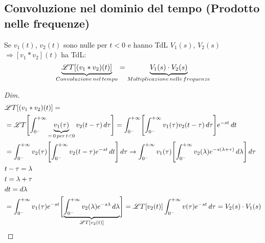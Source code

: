 \subsection{Convoluzione nel dominio del tempo (Prodotto nelle frequenze)}
Se $v_1(t)$, $v_2(t)$ sono nulle per $t < 0$ e hanno TdL $V_1(s)$, $V_2(s)$ $\Rightarrow [v_1 * v_2](t)$ ha TdL:\\
\[
   \underbrace{\mathscr{L}T[(v_1 * v_2)(t)]}_{Convoluzione\, nel\, tempo} = \underbrace{V_1(s)\cdot V_2(s)}_{Moltiplicazione\, nelle\, frequenze}
\]
\begin{proof}[Dim]
   \[
      \begin{split}
         &\mathscr{L}T[(v_1 * v_2)(t)] =\\
         & = \mathscr{L}T\Biggl[\int_{0^-}^{+\infty} \underbrace{v_1(\tau)}_{=\, 0\, per\, t < 0}v_2(t - \tau)\,d\tau\Biggr] = \int_{0^-}^{+\infty}\Biggl[\int_{0^-}^{+\infty} v_1(\tau)v_2(t - \tau)\,d\tau\Biggr]e^{-st}\,dt\\
         & = \int_{0^-}^{+\infty} v_2(\tau)\Biggl[\int_{0^-}^{+\infty} v_2(t - \tau)e^{-st}\,dt\Biggr]\,d\tau \rightarrow \int_{0^-}^{+\infty} v_1(\tau)\Biggl[\int_{0^-}^{+\infty} v_2(\lambda)e^{-s(\lambda + \tau)}\,d\lambda\Biggr]\,d\tau \\ 
         & t - \tau = \lambda \\
         & t = \lambda + \tau \\
         & dt = d\lambda \\
         & = \int_{0^-}^{+\infty} v_1(\tau)e^{-st}\Biggl[\underbrace{\int_{0^-}^{+\infty} v_2(\lambda)e^{-s\lambda}\,d\lambda}_{\mathscr{L}T[v_2(t)]}\Biggr] = \mathscr{L}T[v_2(t)]\int_{0^-}^{+\infty} v(\tau)e^{-st}\,d\tau = V_2(s)\cdot V_1(s)
      \end{split}
   \]
\end{proof}


